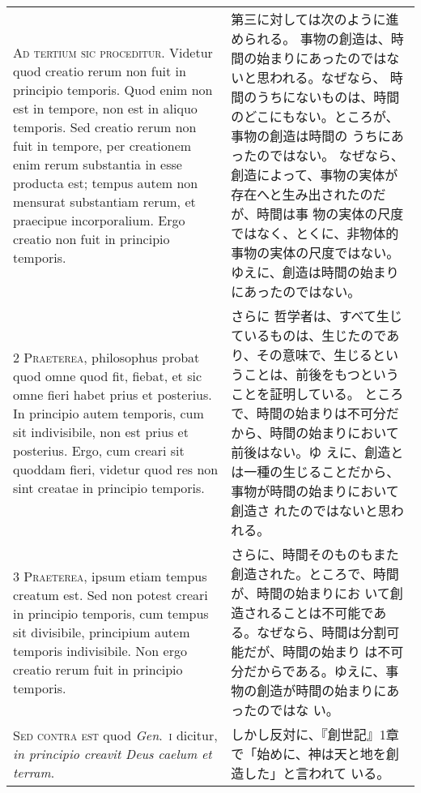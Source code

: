\documentclass[10pt]{jsarticle} %
\begin{document}
\begin{longtable}{p{21em}p{21em}}

{\huge A}{\scshape d tertium sic proceditur}. Videtur quod
creatio rerum non fuit in principio temporis. Quod enim non est in
tempore, non est in aliquo temporis. Sed creatio rerum non fuit in
tempore, per creationem enim rerum substantia in esse producta est;
tempus autem non mensurat substantiam rerum, et praecipue
incorporalium. Ergo creatio non fuit in principio temporis.

&
第三に対しては次のように進められる。
事物の創造は、時間の始まりにあったのではないと思われる。なぜなら、
時間のうちにないものは、時間のどこにもない。ところが、事物の創造は時間の
 うちにあったのではない。
なぜなら、創造によって、事物の実体が存在へと生み出されたのだが、時間は事
 物の実体の尺度ではなく、とくに、非物体的事物の実体の尺度ではない。
ゆえに、創造は時間の始まりにあったのではない。

\\


{\scshape 2 Praeterea}, philosophus probat quod omne
quod fit, fiebat, et sic omne fieri habet prius et posterius. In
principio autem temporis, cum sit indivisibile, non est prius et
posterius. Ergo, cum creari sit quoddam fieri, videtur quod res non sint
creatae in principio temporis.


&

さらに
哲学者は、すべて生じているものは、生じたのであり、その意味で、生じるとい
 うことは、前後をもつということを証明している。
ところで、時間の始まりは不可分だから、時間の始まりにおいて前後はない。ゆ
 えに、創造とは一種の生じることだから、事物が時間の始まりにおいて創造さ
 れたのではないと思われる。
\\

{\scshape 3 Praeterea}, ipsum etiam tempus creatum
est. Sed non potest creari in principio temporis, cum tempus sit
divisibile, principium autem temporis indivisibile. Non ergo creatio
rerum fuit in principio temporis.

&
さらに、時間そのものもまた創造された。ところで、時間が、時間の始まりにお
 いて創造されることは不可能である。なぜなら、時間は分割可能だが、時間の始まり
 は不可分だからである。ゆえに、事物の創造が時間の始まりにあったのではな
 い。

\\


{\scshape Sed contra est} quod {\itshape Gen}.~{\scshape i} dicitur,
{\itshape in principio creavit Deus caelum et terram}.

&
しかし反対に、『創世記』1章で「始めに、神は天と地を創造した」と言われて
 いる。


\end{longtable}
\end{document}

